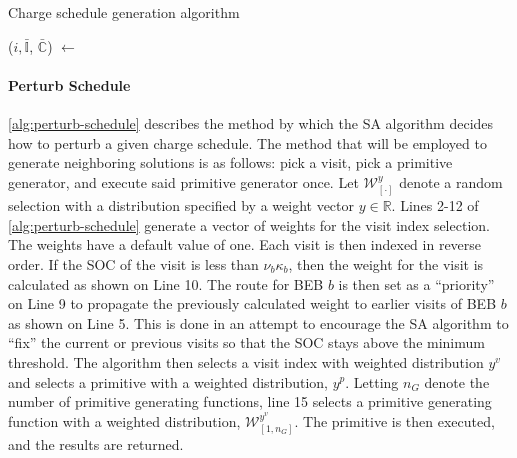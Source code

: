 \documentclass[ee,thesis]{usuthesis}
\newcommand{\I}{\mathbb{I}}                 %
\newcommand{\C}{\mathbb{C}}                 %
\newcommand{\W}{\mathcal{W}}                %
\begin{document}
\begin{algorithm}[H]
\scriptsize
\caption{Charge schedule generation algorithm} \label{alg:charge-schedule-generation}
    \LinesNumbered
    \KwIn{$(\I, \C)$}
    \KwOut{$(\bar{\I}, \bar{\C})$}


    \Begin
    {
        \ForEach {$\I_i \in \I$}
        {
            ($i, \bar{\I}$, $\bar{\C}$) $\leftarrow$ \NewVisit{($\I_i$, $\I$, $\C$)}
        }
            \Return{($\bar{\I}$, $\bar{\C}$)}
    }
  \end{algorithm}

\paragraph{Perturb Schedule}
\label{sec:sa-tweak-schedule}
\ref{alg:perturb-schedule} describes the method by which the SA algorithm decides how to perturb a given charge
schedule. The method that will be employed to generate neighboring solutions is as follows: pick a visit, pick a
primitive generator, and execute said primitive generator once. Let \(\W^y_{[\cdot]}\) denote a random selection with a
distribution specified by a weight vector \(y \in \mathbb{R}\). Lines 2-12 of \ref{alg:perturb-schedule} generate a vector of weights
for the visit index selection. The weights have a default value of one. Each visit is then indexed in reverse order. If
the SOC of the visit is less than \(\nu_b \kappa_b\), then the weight for the visit is calculated as shown on Line 10. The route
for BEB \(b\) is then set as a ``priority'' on Line 9 to propagate the previously calculated weight to earlier visits of BEB
\(b\) as shown on Line 5. This is done in an attempt to encourage the SA algorithm to ``fix'' the current or previous visits
so that the SOC stays above the minimum threshold. The algorithm then selects a visit index with weighted distribution
\(y^v\) and selects a primitive with a weighted distribution, \(y^p\). Letting \(n_G\) denote the number of primitive
generating functions, line 15 selects a primitive generating function with a weighted distribution, \(\W^{y^v}_{[1,
n_G]}\). The primitive is then executed, and the results are returned.
\end{document}
